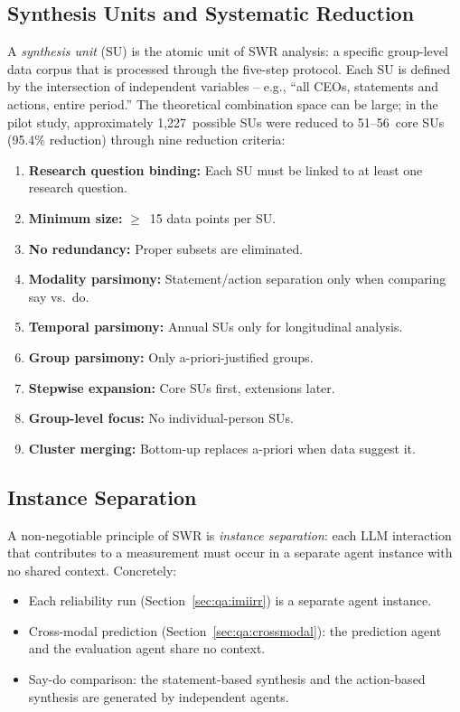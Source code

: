 \documentclass[11pt,a4paper]{article}
\begin{document}
\subsection{Synthesis Units and Systematic Reduction}
\label{sec:method:su}

A \emph{synthesis unit} (SU) is the atomic unit of SWR analysis: a specific group-level data corpus that is processed through the five-step protocol. Each SU is defined by the intersection of independent variables -- e.g., ``all CEOs, statements and actions, entire period.'' The theoretical combination space can be large; in the pilot study, approximately 1,227~possible SUs were reduced to 51--56~core SUs (95.4\% reduction) through nine reduction criteria:

\begin{enumerate}[nosep]
  \item \textbf{Research question binding:} Each SU must be linked to at least one research question.
  \item \textbf{Minimum size:} $\geq$~15 data points per SU.
  \item \textbf{No redundancy:} Proper subsets are eliminated.
  \item \textbf{Modality parsimony:} Statement/action separation only when comparing say vs.\ do.
  \item \textbf{Temporal parsimony:} Annual SUs only for longitudinal analysis.
  \item \textbf{Group parsimony:} Only a-priori-justified groups.
  \item \textbf{Stepwise expansion:} Core SUs first, extensions later.
  \item \textbf{Group-level focus:} No individual-person SUs.
  \item \textbf{Cluster merging:} Bottom-up replaces a-priori when data suggest it.
\end{enumerate}


\subsection{Instance Separation}
\label{sec:method:instance}

A non-negotiable principle of SWR is \emph{instance separation}: each LLM interaction that contributes to a measurement must occur in a separate agent instance with no shared context. Concretely:

\begin{itemize}[nosep]
  \item Each reliability run (Section~\ref{sec:qa:imiirr}) is a separate agent instance.
  \item Cross-modal prediction (Section~\ref{sec:qa:crossmodal}): the prediction agent and the evaluation agent share no context.
  \item Say-do comparison: the statement-based synthesis and the action-based synthesis are generated by independent agents.
\end{itemize}
\end{document}
